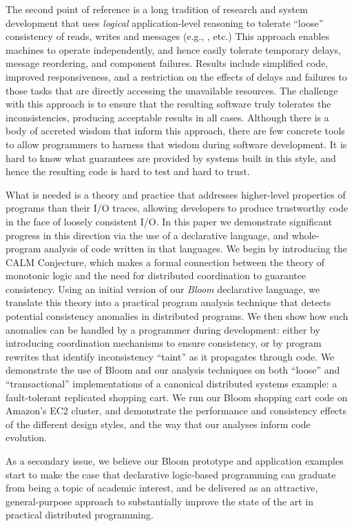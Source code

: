 The second point of reference is a long tradition of research and system development that uses {\em logical} application-level reasoning to tolerate ``loose'' consistency of reads, writes and messages (e.g., \cite{sagas,base,acid20}, etc.)  This approach enables machines to operate independently, and hence easily tolerate temporary delays, message reordering, and component failures.  Results include simplified code, improved responsiveness, and a restriction on the effects of delays and failures to those tasks that are directly accessing the unavailable resources.  The challenge with this approach is to ensure that the resulting software truly tolerates the inconsistencies, producing acceptable results in all cases.  Although there is a body of accreted wisdom that inform this approach, there are few concrete tools to allow programmers to harness that wisdom during software development.  It is hard to know what guarantees are provided by systems built in this style, and hence the resulting code is hard to test and hard to trust.  

What is needed is a theory and practice that addresses higher-level properties of programs than their I/O traces, allowing developers to produce trustworthy code in the face of loosely consistent I/O.  In this paper we demonstrate significant progress in this direction via the use of a declarative language, and whole-program analysis of code written in that languages.  We begin by introducing the CALM Conjecture, which makes a formal connection between the theory of monotonic logic and the need for distributed coordination to guarantee consistency.  Using an initial version of our {\em Bloom} declarative language, we translate this theory into a practical program analysis technique that detects potential consistency anomalies in distributed programs.  We then show how such anomalies can be handled by a programmer during development: either by introducing coordination mechanisms to ensure consistency, or by program rewrites that identify inconsistency ``taint'' as it propagates through code.  We demonstrate the use of Bloom and our analysis techniques on both ``loose'' and ``transactional'' implementations of a canonical distributed systems example: a fault-tolerant replicated shopping cart.  We run our Bloom shopping cart code on Amazon's EC2 cluster, and demonstrate the performance and consistency effects of the different design styles, and the way that our analyses inform code evolution.

As a secondary issue, we believe our Bloom prototype and application examples start to make the case that declarative logic-based programming can graduate from being a topic of academic interest, and be delivered as an attractive, general-purpose approach to substantially improve the state of the art in practical distributed programming.
